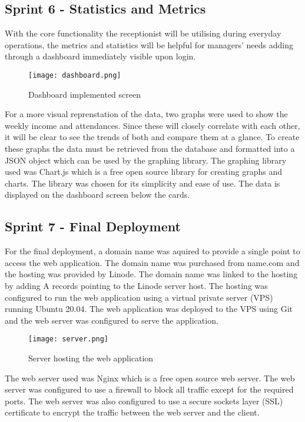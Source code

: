 \subsection{Sprint 6 - Statistics and Metrics}
With the core functionality the receptionist will be utilising during everyday operations, the metrics and statistics will be helpful for managers' needs adding through a dashboard immediately visible upon login.

\begin{figure}[ht!]
    \centerline{\texttt{[image: dashboard.png]}}
    \caption{Dashboard implemented screen}
    \label{fig:dashboard-screen}
\end{figure}

For a more visual reprenstation of the data, two graphs were used to show the weekly income and attendances. Since these will closely correlate with each other, it will be clear to see the trends of both and compare them at a glance. To create these graphs the data must be retrieved from the database and formatted into a JSON object which can be used by the graphing library. The graphing library used was Chart.js which is a free open source library for creating graphs and charts. The library was chosen for its simplicity and ease of use. The data is displayed on the dashboard screen below the cards.


\subsection{Sprint 7 - Final Deployment}
For the final deployment, a domain name was aquired to provide a single point to access the web application. The domain name was purchased from name.com and the hosting was provided by Linode. The domain name was linked to the hosting by adding A records pointing to the Linode server host. The hosting was configured to run the web application using a virtual private server (VPS) running Ubuntu 20.04. The web application was deployed to the VPS using Git and the web server was configured to serve the application.

\begin{figure}[ht!]
    \centerline{\texttt{[image: server.png]}}
    \caption{Server hosting the web application}
    \label{fig:server}
\end{figure}

The web server used was Nginx which is a free open source web server. The web server was configured to use a firewall to block all traffic except for the required ports. The web server was also configured to use a secure sockets layer (SSL) certificate to encrypt the traffic between the web server and the client.

